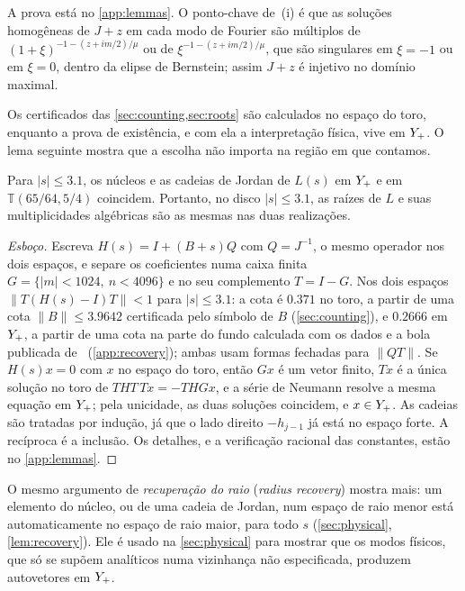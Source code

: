 A prova está no \cref{app:lemmas}. O ponto-chave de~(i) é que as soluções homogêneas de $J+z$ em cada
modo de Fourier são múltiplos de $(1+\xi)^{-1-(z+im/2)/\mu}$ ou de $\xi^{-1-(z+im/2)/\mu}$, que são singulares em
$\xi=-1$ ou em $\xi=0$, dentro da elipse de Bernstein; assim $J+z$ é injetivo no domínio maximal.

Os certificados das \cref{sec:counting,sec:roots} são calculados no espaço do toro, enquanto a prova de
existência, e com ela a interpretação física, vive em $Y_{+}$. O lema seguinte mostra que a
escolha não importa na região em que contamos.

\begin{lemma}\label{lem:Lreal}
Para $|s|\le 3.1$, os núcleos e as cadeias de Jordan de $L(s)$ em $Y_{+}$ e em $\mathbb T(65/64,5/4)$
coincidem. Portanto, no disco $|s|\le3.1$, as raízes de $L$ e suas multiplicidades algébricas são as mesmas
nas duas realizações.
\end{lemma}

\begin{proof}[Esboço]
Escreva $H(s)=I+(B+s)Q$ com $Q=J^{-1}$, o mesmo operador nos dois espaços, e separe os coeficientes numa
caixa finita $G=\{|m|<1024,\ n<4096\}$ e no seu complemento $T=I-G$. Nos dois espaços
$\|T(H(s)-I)T\|<1$ para $|s|\le3.1$: a cota é $0.371$ no toro, a partir de uma cota
$\|B\|\le3.9642$ certificada pelo símbolo de $B$ (\cref{sec:counting}), e $0.2666$ em $Y_{+}$, a partir de uma cota na
parte do fundo calculada com os dados e a bola publicada de~\cite{RT2019} (\cref{app:recovery}); ambas usam formas fechadas para $\|QT\|$. Se $H(s)x=0$ com $x$ no
espaço do toro, então $Gx$ é um vetor finito, $Tx$ é a única solução no toro de
$THT\,Tx=-THGx$, e a série de Neumann resolve a mesma equação em $Y_{+}$; pela unicidade, as duas
soluções coincidem, e $x\in Y_{+}$. As cadeias são tratadas por indução, já que o lado direito
$-h_{j-1}$ já está no espaço forte. A recíproca é a inclusão. Os detalhes, e a verificação
racional das constantes, estão no \cref{app:lemmas}.
\end{proof}

\begin{remark}\label{rem:radius}
O mesmo argumento de \emph{recuperação do raio} (\emph{radius recovery}) mostra mais: um elemento do núcleo, ou de uma cadeia de Jordan, num
espaço de raio menor está automaticamente no espaço de raio maior, para todo $s$
(\cref{sec:physical}, \cref{lem:recovery}). Ele é usado na \cref{sec:physical} para mostrar que os modos físicos,
que só se supõem analíticos numa vizinhança não especificada, produzem autovetores em $Y_{+}$.
\end{remark}
